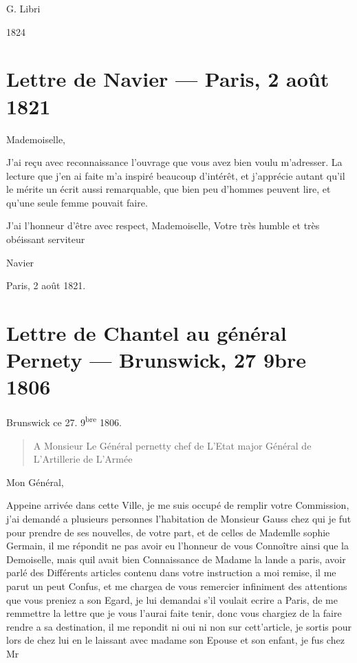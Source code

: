 \documentclass[11pt,a4paper]{article}
\begin{document}
G. Libri

1824

\section{Lettre de Navier — Paris, 2 août 1821}


Mademoiselle,

J'ai reçu avec reconnaissance l'ouvrage que vous avez bien voulu m'adresser. La
lecture que j'en ai faite m'a inspiré beaucoup d'intérêt, et j'apprécie autant
qu'il le mérite un écrit aussi remarquable, que bien peu d'hommes peuvent lire,
et qu'une seule femme pouvait faire.

J'ai l'honneur d'être avec respect, Mademoiselle, Votre très humble et très
obéissant serviteur

Navier

Paris, 2 août 1821.

\section{Lettre de Chantel au général Pernety — Brunswick, 27 9bre 1806}

Brunswick ce 27. 9\textsuperscript{bre} 1806.

\begin{quote}
A Monsieur Le Général pernetty chef de L'Etat major Général de L'Artillerie de
L'Armée
\end{quote}

Mon Général,

Appeine arrivée dans cette Ville, je me suis occupé de remplir votre
Commission, j'ai demandé a plusieurs personnes l'habitation de Monsieur Gauss
chez qui je fut pour prendre de ses nouvelles, de votre part, et de celles de
Mademlle sophie Germain, il me répondit ne pas avoir eu l'honneur de vous
Connoître ainsi que la Demoiselle, mais quil avait bien Connaissance de Madame
la lande a paris,  avoir parlé des Différents articles contenu
dans votre instruction a moi remise, il me parut un peut Confus, et me chargea
de vous remercier infiniment des attentions que vous preniez a son Egard, je
lui demandai s'il voulait ecrire a Paris, de me remmettre la lettre que je vous
l'aurai faite tenir, donc vous chargiez de la faire rendre a sa destination, il
me repondit ni oui ni non sur cett'article, je sortis pour lors de chez lui en
le laissant avec madame son Epouse et son enfant, je fus chez Mr
\end{document}
